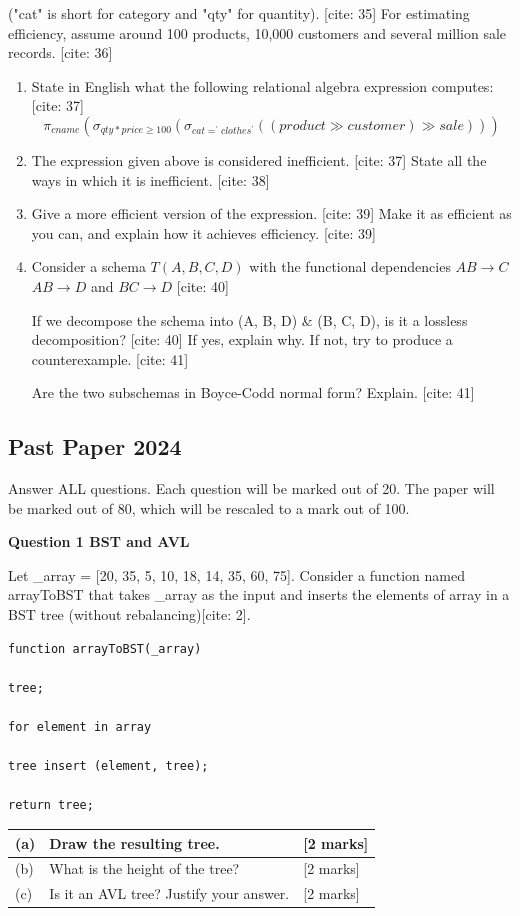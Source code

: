 ("cat" is short for category and "qty" for quantity). [cite: 35] For estimating efficiency, assume around 100 products, 10,000 customers and several million sale records. [cite: 36]
\begin{enumerate}
    \item[(a)] State in English what the following relational algebra expression computes: [cite: 37]
    $$\pi_{cname}(\sigma_{qty*price\ge100}(\sigma_{cat=^{\prime}clothes^{\prime}}((product\gg customer)\gg sale)))$$
    \item[(b)] The expression given above is considered inefficient. [cite: 37] State all the ways in which it is inefficient. [cite: 38]
    \item[(c)] Give a more efficient version of the expression. [cite: 39] Make it as efficient as you can, and explain how it achieves efficiency. [cite: 39]
    \item[(d)] Consider a schema $T(A,B,C,D)$ with the functional dependencies $AB\longrightarrow C$ $AB\longrightarrow D$ and $BC\longrightarrow D$ [cite: 40]

    If we decompose the schema into (A, B, D) \& (B, C, D), is it a lossless decomposition? [cite: 40] If yes, explain why. If not, try to produce a counterexample. [cite: 41]

    Are the two subschemas in Boyce-Codd normal form? Explain. [cite: 41]
\end{enumerate}


\subsection{Past Paper 2024}
Answer ALL questions. Each question will be marked out of 20. The paper will be marked out of 80, which will be rescaled to a mark out of 100.

\textbf{Question 1 BST and AVL}

Let \_array = [20, 35, 5, 10, 18, 14, 35, 60, 75]. Consider a function named arrayToBST that takes \_array as the input and inserts the elements of array in a BST tree (without rebalancing)[cite: 2].
\begin{verbatim}
function arrayToBST(_array)

tree;

for element in array

tree insert (element, tree);

return tree;
\end{verbatim}
\begin{longtable}{|p{}|p{}|p{}|}
\hline
(a) & Draw the resulting tree. & [2 marks] \\
\hline
(b) & What is the height of the tree? & [2 marks] \\
\hline
(c) & Is it an AVL tree? Justify your answer. & [2 marks] \\
\hline
\end{longtable}

